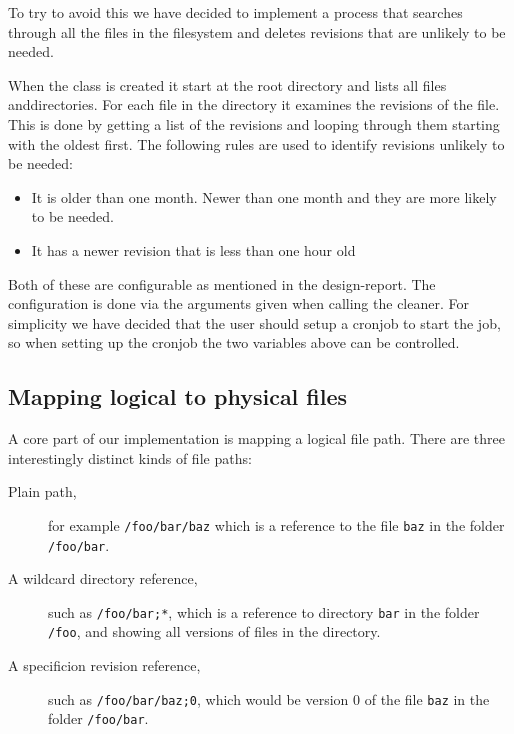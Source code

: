\documentclass[12pt]{article}
\begin{document}
To try to avoid this we have decided to implement a process that searches
through all the files in the filesystem and deletes revisions that are unlikely
to be needed.

When the class is created it start at the root directory and lists all files
anddirectories. For each file in the directory it examines the revisions of the
file.
This is done by getting a list of the revisions and looping through them
starting with the oldest first.
The following rules are used to identify revisions unlikely to be needed:

\begin{itemize}
\item It is older than one month. Newer than one month and they are more likely
to be needed.
\item It has a newer revision that is less than one hour old
\end{itemize}

Both of these are configurable as mentioned in the design-report. The
configuration is done via the arguments given when calling the cleaner. For
simplicity we have decided that the user should setup a cronjob to start the
job, so when setting up the cronjob the two variables above can be controlled.


\subsection{Mapping logical to physical files}

A core part of our implementation is mapping a logical file path.
There are three interestingly distinct kinds of file paths:

\begin{description}
\item[Plain path,] for example \texttt{/foo/bar/baz} which is a
  reference to the file \texttt{baz} in the folder \texttt{/foo/bar}.
\item[A wildcard directory reference,] such as \texttt{/foo/bar;*},
  which is a reference to directory \texttt{bar} in the folder
  \texttt{/foo}, and showing all versions of files in the directory.
\item[A specificion revision reference,] such as
  \texttt{/foo/bar/baz;0}, which would be version $0$ of the file
  \texttt{baz} in the folder \texttt{/foo/bar}.
\end{description}
\end{document}
